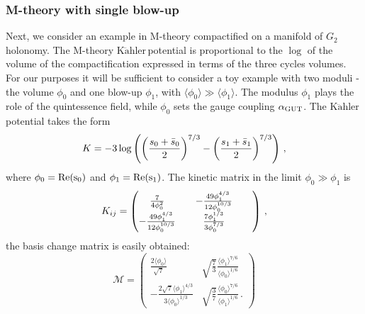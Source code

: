 \documentclass[11pt,a4paper]{article}
\newcommand{\Kahler}{\ensuremath{\text{K}\ddot{\text{a}}\text{hler}\,}}
\begin{document}
\subsubsection{M-theory with single blow-up}
%
Next, we consider an example in M-theory compactified on a manifold of $G_2$ holonomy. The M-theory \Kahler potential is proportional to the $\log$ of the volume of the compactification expressed in terms of the three cycles volumes. For our purposes it will be sufficient to consider a toy example with two moduli - the volume $\phi_0$ and one blow-up $\phi_1$, with $\langle \phi_0 \rangle \gg \langle \phi_1 \rangle$. The modulus $\phi_1$ plays the role of the quintessence field, while $\phi_0$ sets the gauge coupling $\alpha_{\rm GUT}$. The \Kahler potential takes the form
%
$$
  K =  -3 \log \left(  \left( {   s_0 + \bar{s}_0 \over 2 } \right)^{7/3} -    \left(  {s_1 + \bar{s}_1  \over 2 } \right)^{7/3}  \right)  \,,
$$
%
where $\phi_0 = \rm{Re}(s_0)$ and $\phi_1 = \rm{Re}(s_1)$. The kinetic matrix in the limit $\phi_0 \gg \phi_1$ is
%
\begin{equation}
K_{ij} = \begin{pmatrix}
{ 7  \over 4 \phi_0^{2} }&& -{ 49 \phi_1^{4/3} \over 12 \phi_0^{10/3}}&&  \\
  -{ 49 \phi_1^{4/3} \over 12 \phi_0^{10/3}} &&{7 \phi_1^{1/3}\over 3 \phi_0^{7/3}}
\end{pmatrix} \,,
\end{equation}%
%
the basis change matrix is easily obtained:
\begin{equation}
\mathcal{M} = \begin{pmatrix}
\frac{2 \langle \phi_0 \rangle}{\sqrt{7}} & \sqrt{\frac{7}{3}} \frac{\langle \phi_1 \rangle^{7/6}}{\langle \phi_0 \rangle^{1/6}} \\
- \frac{2 \sqrt{7} \langle \phi_1 \rangle^{4/3}}{3 \langle \phi_0 \rangle^{1/3}} & \sqrt{\frac{3}{7}} \frac{\langle \phi_0 \rangle^{7/6}}{\langle \phi_1 \rangle^{1/6}} \,.
\end{pmatrix}
\end{equation} 
\end{document}
